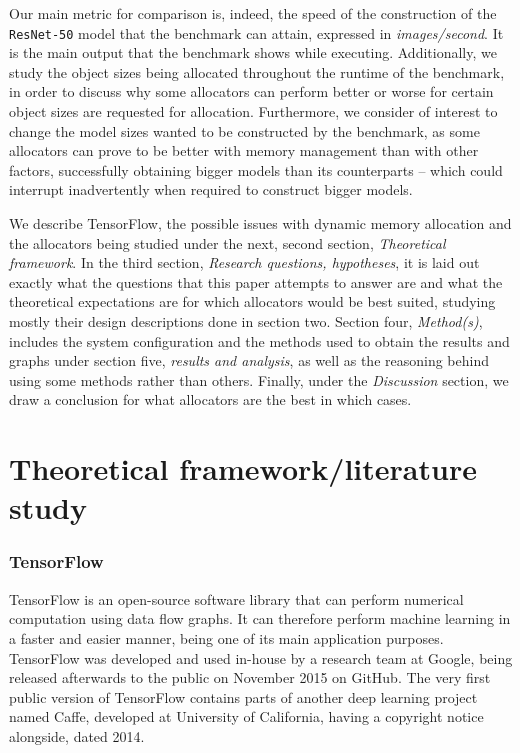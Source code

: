 \documentclass[12pt,twoside]{article}
\begin{document}
Our main metric for comparison is, indeed, the speed of the construction of the \texttt{ResNet-50} model that the benchmark can attain, expressed in \textit{images/second}. It is the main output that the benchmark shows while executing. Additionally, we study the object sizes being allocated throughout the runtime of the benchmark, in order to discuss why some allocators can perform better or worse for certain object sizes are requested for allocation. Furthermore, we consider of interest to change the model sizes wanted to be constructed by the benchmark, as some allocators can prove to be better with memory management than with other factors, successfully obtaining bigger models than its counterparts -- which could interrupt inadvertently when required to construct bigger models.

We describe TensorFlow, the possible issues with dynamic memory allocation and the allocators being studied under the next, second section, \textit{Theoretical framework}. In the third section, \textit{Research questions, hypotheses}, it is laid out exactly what the questions that this paper attempts to answer are and what the theoretical expectations are for which allocators would be best suited, studying mostly their design descriptions done in section two. Section four, \textit{Method(s)}, includes the system configuration and the methods used to obtain the results and graphs under section five, \textit{results and analysis}, as well as the reasoning behind using some methods rather than others. Finally, under the \textit{Discussion} section, we draw a conclusion for what allocators are the best in which cases.




\section{Theoretical framework/literature study}
\label{sec:theoretical-framework}

\subsubsection*{TensorFlow}

TensorFlow is an open-source software library that can perform numerical computation using data flow graphs. It can therefore perform machine learning in a faster and easier manner, being one of its main application purposes. TensorFlow was developed and used in-house by a research team at Google, being released afterwards to the public on November 2015 on GitHub. The very first public version of TensorFlow contains parts of another deep learning project named Caffe, developed at University of California, having a copyright notice alongside, dated 2014.
\end{document}
